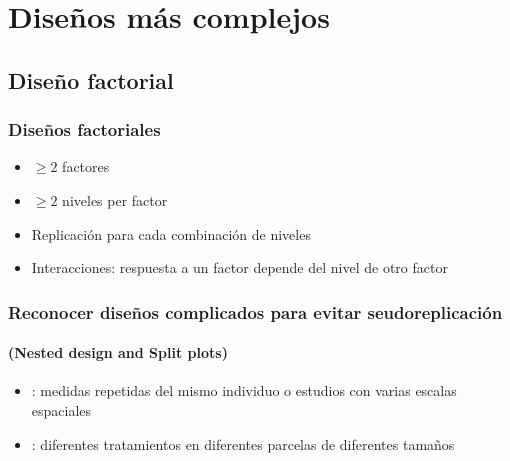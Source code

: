 \documentclass[mathserif]{beamer}
\begin{document}
\section[Otros dise\~nos]{Dise\~nos m\'as complejos}

\subsection[Dise\~no factorial]{Dise\~no factorial}

\begin{frame}[label=factexp]
   \frametitle{Dise\~nos factoriales}
    \begin{itemize}
      \item $\geq2$ factores
      \item $\geq2$ niveles per factor
      \item Replicaci\'on para cada combinaci\'on de niveles
      \item Interacciones: respuesta a un factor depende del nivel de otro factor
   \end{itemize}
\end{frame}%


\begin{frame}[label=nestsplit]
   \frametitle{Reconocer dise\~nos complicados para evitar seudoreplicaci\'on} 
   \framesubtitle{(Nested design and Split plots)} 
   \begin{itemize} 
      \item {}: medidas repetidas del mismo individuo o estudios con varias escalas espaciales 
      \item {}: diferentes tratamientos en diferentes parcelas de diferentes tama\~nos
      \end{itemize}
\end{frame}%
\end{document}
